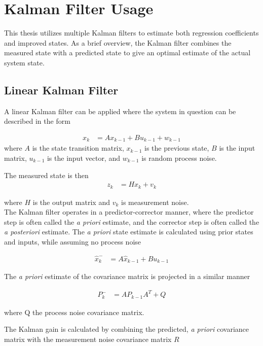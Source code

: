 \section{Kalman Filter Usage}
\label{kalman-filter}
This thesis utilizes multiple Kalman filters to estimate both regression coefficients and improved states. As a brief overview, the Kalman filter combines the measured state with a predicted state to give an optimal\cite{kalman60} estimate of the actual system state.

\subsection{Linear Kalman Filter}
A linear Kalman filter can be applied\cite{welch1995introduction} where the system in question can be described in the form 

\begin{align}
x_k &= Ax_{k-1} + Bu_{k-1}+w_{k-1}
\end{align}
where $A$ is the state transition matrix, $x_{k-1}$ is the previous state, $B$ is the input matrix, $u_{k-1}$ is the input vector, and $w_{k-1}$ is random process noise.

The measured state is then 
\begin{align}
z_k &= Hx_k+v_k
\end{align} 

where $H$ is the output matrix and $v_k$ is measurement noise.\\

The Kalman filter operates in a predictor-corrector manner, where the predictor step is often called the \textit{a priori} estimate, and the corrector step is often called the \textit{a posteriori} estimate. The \textit{a priori} state estimate is calculated using prior states and inputs, while assuming no process noise

\begin{align}
\hat{x}^-_k &= A\hat{x}_{k-1}+Bu_{k-1}
\end{align}

The \textit{a priori} estimate of the covariance matrix is projected in a similar manner

\begin{align}
P^-_k &= AP_{k-1}A^T+Q
\end{align}

where Q the process noise covariance matrix.

The Kalman gain is calculated by combining the predicted, \textit{a priori} covariance matrix with the measurement noise covariance matrix $R$

